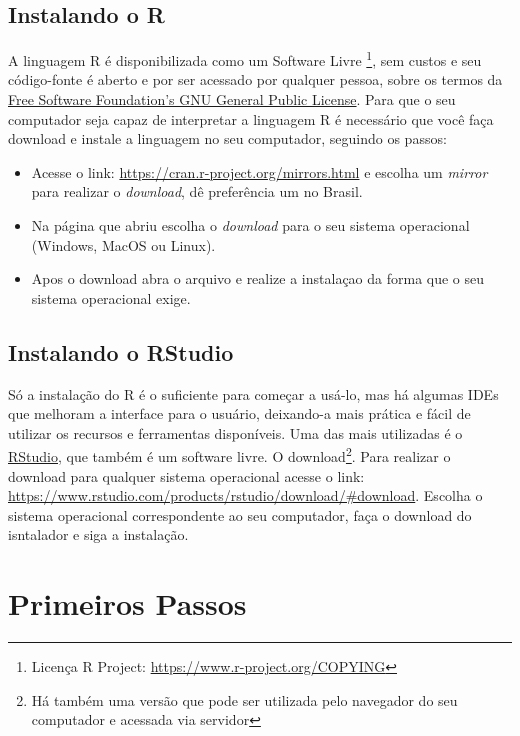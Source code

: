 \documentclass[]{book}
\providecommand{\tightlist}{%
  \setlength{\itemsep}{0pt}\setlength{\parskip}{0pt}}
\let\rmarkdownfootnote\footnote%
\def\footnote{\protect\rmarkdownfootnote}
\theoremstyle{definition}
\theoremstyle{definition}
\theoremstyle{definition}
\theoremstyle{remark}
\begin{document}
\hypertarget{instalando-o-r}{%
\section{Instalando o R}\label{instalando-o-r}}

A linguagem R é disponibilizada como um Software Livre \footnote{Licença R Project: \url{https://www.r-project.org/COPYING}}, sem custos e seu código-fonte é aberto e por ser acessado por qualquer pessoa, sobre os termos da \href{https://www.gnu.org/}{Free Software Foundation's GNU General Public License}. Para que o seu computador seja capaz de interpretar a linguagem R é necessário que você faça download e instale a linguagem no seu computador, seguindo os passos:

\begin{itemize}
\tightlist
\item
  Acesse o link: \url{https://cran.r-project.org/mirrors.html} e escolha um \emph{mirror} para realizar o \emph{download}, dê preferência um no Brasil.
\item
  Na página que abriu escolha o \emph{download} para o seu sistema operacional (Windows, MacOS ou Linux).
\item
  Apos o download abra o arquivo e realize a instalaçao da forma que o seu sistema operacional exige.
\end{itemize}

\hypertarget{instalando-o-rstudio}{%
\section{Instalando o RStudio}\label{instalando-o-rstudio}}

Só a instalação do R é o suficiente para começar a usá-lo, mas há algumas IDEs que melhoram a interface para o usuário, deixando-a mais prática e fácil de utilizar os recursos e ferramentas disponíveis.
Uma das mais utilizadas é o \href{https://rstudio.com/}{RStudio}, que também é um software livre. O download\footnote{Há também uma versão que pode ser utilizada pelo navegador do seu computador e acessada via servidor}. Para realizar o download para qualquer sistema operacional acesse o link: \url{https://www.rstudio.com/products/rstudio/download/\#download}. Escolha o sistema operacional correspondente ao seu computador, faça o download do isntalador e siga a instalação.

\hypertarget{prim}{%
\chapter{Primeiros Passos}\label{prim}}
\end{document}

